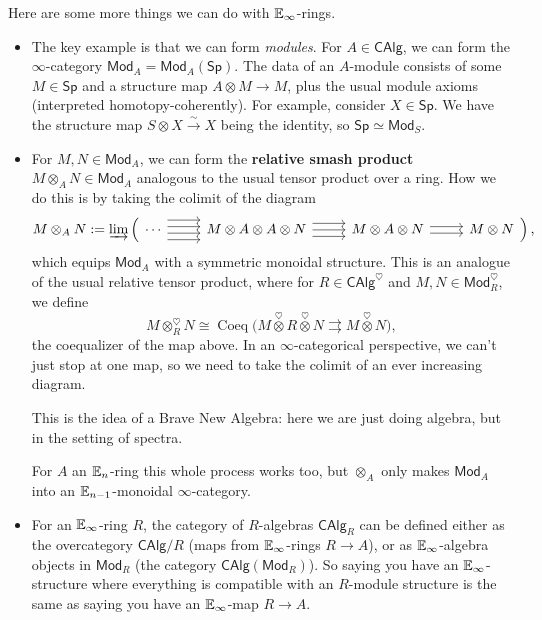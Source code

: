 \begin{example}
Here are some more things we can do with $\mathbb{E}_{\infty}$-rings.
\begin{itemize}
\setlength\itemsep{-.2em}
    \item The key example is that we can form \emph{modules}. For $A \in \mathsf{CAlg} $, we can form the $\infty$-category $\mathsf{Mod} _A = \mathsf{Mod} _A(\mathsf{Sp} )$. The data of an $A$-module consists of some $M \in \mathsf{Sp} $ and a structure map $A\otimes M \to M$, plus the usual module axioms (interpreted homotopy-coherently).
        For example, consider $X \in \mathsf{Sp} $. We have the structure map $S \otimes X \xrightarrow{\sim} X$ being the identity, so $\mathsf{Sp} \simeq  \mathsf{Mod} _S$.

    \item For $M,N \in \mathsf{Mod} _A$, we can form the \textbf{relative smash product}  $M\otimes_A N \in \mathsf{Mod} _A$ analogous to the usual tensor product over a ring. How we do this is by taking the colimit of the diagram \[
             M\otimes_A N:=\varinjlim\left(             \begin{tikzcd}
                   \cdots \arrow[r, shift left=3] \arrow[r, shift left] \arrow[r, shift right] \arrow[r, shift right=3] & M\otimes A\otimes A \otimes N \arrow[r] \arrow[r, shift left=2] \arrow[r, shift right=2] & M\otimes A \otimes N \arrow[r, shift right] \arrow[r, shift left] & M\otimes N
                   \end{tikzcd} \right) ,
    \] which equips $\mathsf{Mod} _A$ with a symmetric monoidal structure. This is an analogue of the usual relative tensor product, where for $R \in \mathsf{CAlg} ^{\heartsuit}$ and $M,N \in  \mathsf{Mod} _R ^{\heartsuit}$, we define \[
    M \otimes_R^{\heartsuit} N\cong \operatorname{Coeq}\big( M \overset{\heartsuit}{\otimes}R \overset{\heartsuit}{\otimes} N \rightrightarrows M \overset{\heartsuit}{\otimes}N \big),
    \] the coequalizer of the map above. In an  $\infty$-categorical perspective, we can't just stop at one map, so we need to take the colimit of an ever increasing diagram.

This is the idea of a Brave New Algebra: here we are just doing algebra, but in the setting of spectra.
\begin{remark}
    For $A$ an $\mathbb{E}_n $-ring this whole process works too, but $\otimes_A$ only makes $\mathsf{Mod} _A$ into an $\mathbb{E}_{n-1}$-monoidal $\infty$-category.
\end{remark}
\item For an $\mathbb{E}_{\infty}$-ring $R$, the category of $R$-algebras $\mathsf{CAlg} _R$ can be defined either as the overcategory $\mathsf{CAlg} / R$ (maps from $\mathbb{E}_{\infty}$-rings $R\to A$), or as $\mathbb{E}_{\infty}$-algebra objects in $\mathsf{Mod} _R$ (the category $\mathsf{CAlg} (\mathsf{Mod} _R)$). So saying you have an $\mathbb{E}_{\infty}$-structure where everything is compatible with an $R$-module structure is the same as saying you have an $\mathbb{E}_{\infty}$-map $R\to A$. 


\end{itemize}
\end{example}
